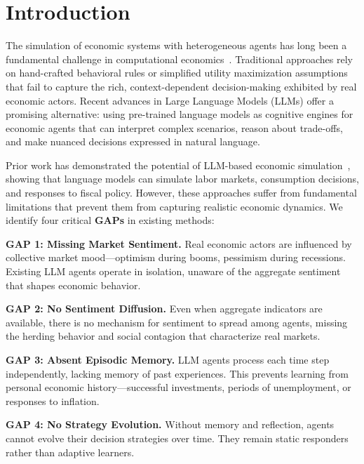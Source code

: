 \documentclass[runningheads]{llncs}
\begin{document}
\section{Introduction}

The simulation of economic systems with heterogeneous agents has long been a fundamental challenge in computational economics~\cite{tesfatsion2006agent}. Traditional approaches rely on hand-crafted behavioral rules or simplified utility maximization assumptions that fail to capture the rich, context-dependent decision-making exhibited by real economic actors. Recent advances in Large Language Models (LLMs) offer a promising alternative: using pre-trained language models as cognitive engines for economic agents that can interpret complex scenarios, reason about trade-offs, and make nuanced decisions expressed in natural language.

Prior work has demonstrated the potential of LLM-based economic simulation~\cite{horton2023large,li2024econagent}, showing that language models can simulate labor markets, consumption decisions, and responses to fiscal policy. However, these approaches suffer from fundamental limitations that prevent them from capturing realistic economic dynamics. We identify four critical \textbf{GAPs} in existing methods:

\textbf{GAP 1: Missing Market Sentiment.} Real economic actors are influenced by collective market mood—optimism during booms, pessimism during recessions. Existing LLM agents operate in isolation, unaware of the aggregate sentiment that shapes economic behavior.

\textbf{GAP 2: No Sentiment Diffusion.} Even when aggregate indicators are available, there is no mechanism for sentiment to spread among agents, missing the herding behavior and social contagion that characterize real markets.

\textbf{GAP 3: Absent Episodic Memory.} LLM agents process each time step independently, lacking memory of past experiences. This prevents learning from personal economic history—successful investments, periods of unemployment, or responses to inflation.

\textbf{GAP 4: No Strategy Evolution.} Without memory and reflection, agents cannot evolve their decision strategies over time. They remain static responders rather than adaptive learners.
\end{document}
